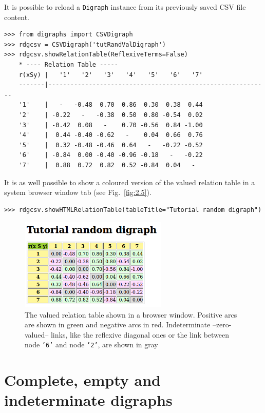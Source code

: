 It is possible to reload a \texttt{Digraph} instance from its previously saved CSV file content.
\begin{lstlisting} 
>>> from digraphs import CSVDigraph   
>>> rdgcsv = CSVDigraph('tutRandValDigraph')
>>> rdgcsv.showRelationTable(ReflexiveTerms=False)
    * ---- Relation Table -----
    r(xSy) |   '1'   '2'   '3'   '4'   '5'   '6'   '7'	  
    -------|------------------------------------------------------------
    '1'    |   -   -0.48  0.70  0.86  0.30  0.38  0.44	 
    '2'    | -0.22   -   -0.38  0.50  0.80 -0.54  0.02	 
    '3'    | -0.42  0.08   -    0.70 -0.56  0.84 -1.00	 
    '4'    |  0.44 -0.40 -0.62   -    0.04  0.66  0.76	 
    '5'    |  0.32 -0.48 -0.46  0.64   -   -0.22 -0.52	 
    '6'    | -0.84  0.00 -0.40 -0.96 -0.18   -   -0.22	 
    '7'    |  0.88  0.72  0.82  0.52 -0.84  0.04   -
\end{lstlisting}
  
It is as well possible to show a coloured version of the valued relation table in a system browser window tab (see Fig.~\vref{fig:2.5}).
\begin{lstlisting}
>>> rdgcsv.showHTMLRelationTable(tableTitle="Tutorial random digraph")
\end{lstlisting}
 \begin{figure}[ht]
\sidecaption[t]
\includegraphics[width=7cm]{Figures/htmlTutorialDigraph.png}
\caption{The valued relation table shown in a browser window. Positive arcs are shown in green and negative arcs in red. Indeterminate --zero-valued-- links, like the reflexive diagonal ones or the link between node \texttt{'6'} and node \texttt{'2'}, are shown in gray}
\label{fig:2.6}       %
\end{figure}
 
\section{Complete, empty and indeterminate digraphs}
\label{sec:2.10}

